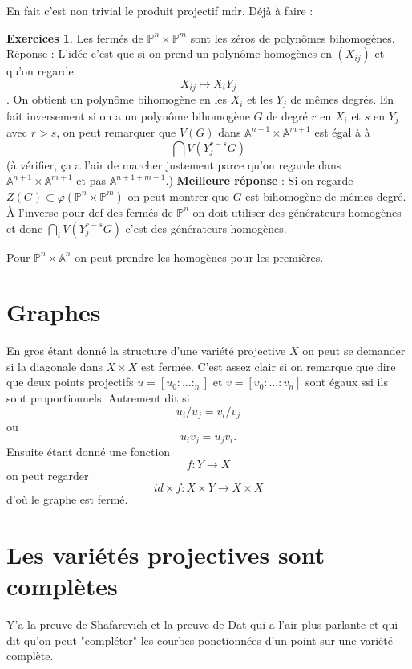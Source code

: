 \documentclass[a4paper,12pt]{book}
\newcommand{\A}{\mathbb{A}}
\renewcommand{\Pr}{\mathbb{P}}
\theoremstyle{plain}
\theoremstyle{definition}
\newtheorem{exo}[subsection]{Exercices}
\theoremstyle{remark}
\begin{document}
En fait c'est non trivial le produit projectif mdr. Déjà à faire :
\begin{exo}
    Les fermés de $\Pr^n\times \Pr^m$ sont les zéros de polynômes 
    bihomogènes. Réponse : L'idée c'est que si on prend un polynôme 
    homogènes en $(X_{ij})$ et qu'on regarde \[X_{ij}\mapsto X_iY_j\]. 
    On obtient un polynôme bihomogène en les $X_i$ et les $Y_j$ de 
    mêmes degrés. En fait inversement si on a un polynôme bihomogène
    $G$ de degré $r$ en $X_i$ et $s$ en $Y_j$ avec $r>s$, on peut 
    remarquer que $V(G)$ dans $\A^{n+1}\times \A^{m+1}$ est égal à 
    à \[\bigcap V(Y_j^{r-s} G)\]
    (à vérifier, ça a l'air de marcher justement parce qu'on regarde
    dans $\A^{n+1}\times \A^{m+1}$ et pas $\A^{n+1+m+1}$.)
    \textbf{Meilleure réponse} : Si on regarde $Z(G)\subset \varphi(
    \Pr^n\times\Pr^m)$ on peut montrer que $G$ est bihomogène de mêmes
    degré. À l'inverse pour def des fermés de $\Pr^n$ on doit utiliser
    des générateurs homogènes et donc $\bigcap_i V(Y_j^{r-s}G)$ c'est des
    générateurs homogènes.
\end{exo}
Pour $\Pr^n\times \A^n$ on peut prendre les homogènes pour les premières.


\section{Graphes}
En gros étant donné la structure d'une variété projective $X$ on peut
se demander si la diagonale dans $X\times X$ est fermée. C'est assez
clair si on remarque que dire que deux points projectifs 
$u=[u_0:\ldots:_n]$ et $v=[v_0:\ldots:v_n]$ sont égaux ssi ils sont
proportionnels. Autrement dit si \[u_i/u_j=v_i/v_j\]
ou \[u_iv_j=u_jv_i.\] Ensuite étant donné une fonction 
\[f\colon Y\to X\]
on peut regarder \[id\times f\colon X\times Y\to X\times X\]
d'où le graphe est fermé.

\section{Les variétés projectives sont complètes}
Y'a la preuve de Shafarevich et la preuve de Dat qui a l'air plus 
parlante et qui dit qu'on peut "compléter" les courbes ponctionnées d'un
point sur une variété complète.
\end{document}
